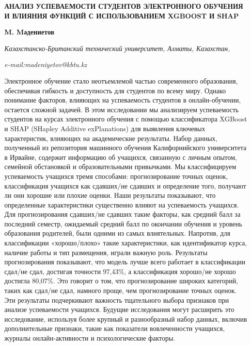 \begin{articleheader}
{\bfseries АНАЛИЗ УСПЕВАЕМОСТИ СТУДЕНТОВ ЭЛЕКТРОННОГО ОБУЧЕНИЯ И ВЛИЯНИЯ ФУНКЦИЙ С ИСПОЛЬЗОВАНИЕМ XGBOOST И SHAP}

{\bfseries M. Mәдениетов}
\end{articleheader}

\begin{affiliation}
\emph{Казахстанско-Британский технический университет, Алматы, Казахстан,}

\emph{e-mail:madeniyetov@kbtu.kz}
\end{affiliation}

Электронное обучение стало неотъемлемой частью современного образования,
обеспечивая гибкость и доступность для студентов по всему миру. Однако
понимание факторов, влияющих на успеваемость студентов в
онлайн-обучении, остается сложной задачей. В этом исследовании мы
анализируем успеваемость студентов на курсах электронного обучения с
помощью классификатора XGBoost и SHAP (SHapley Additive exPlanations)
для выявления ключевых характеристик, влияющих на академические
результаты. Набор данных, полученный из репозитория машинного обучения
Калифорнийского университета в Ирвайне, содержит информацию об учащихся,
связанную с личным опытом, семейной обстановкой и образовательными
привычками. Мы классифицируем успеваемость учащихся тремя способами:
прогнозирование точных оценок, классификация учащихся как сдавших/не
сдавших и определение того, получают ли они хорошие или плохие оценки.
Наши результаты показывают, что определенные характеристики существенно
влияют на успеваемость учащихся. Для прогнозирования сдавших/не сдавших
такие факторы, как средний балл за последний семестр, ожидаемый средний
балл по окончании обучения и уровень образования родителей, были одними
из самых влиятельных. Напротив, для классификации «хорошо/плохо» такие
характеристики, как идентификатор курса, наличие работы и тип
размещения, играли важную роль. Результаты прогнозирования показывают,
что модель лучше всего работает в классификации сдал/не сдал, достигая
точности 97,43\%, а классификация хорошо/не хорошо достигла 80,07\%. Это
говорит о том, что прогнозирование широких категорий, таких как сдал/не
сдал, намного проще, чем прогнозирование точных оценок. Эти результаты
подчеркивают важность тщательного выбора признаков при анализе
успеваемости учащихся. Будущие исследования могут расширить это
исследование, используя более крупный и разнообразный набор данных,
включив дополнительные признаки, такие как показатели вовлеченности
учащихся, журналы онлайн-активности и психологические факторы.

